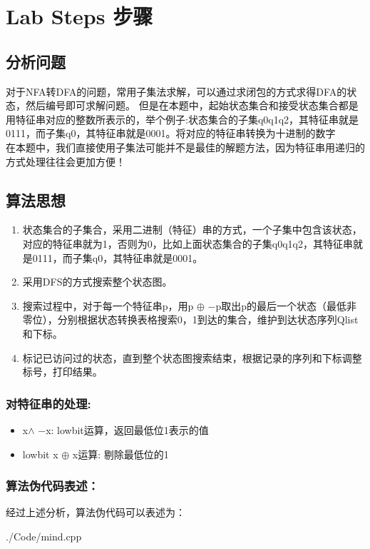 \section{Lab Steps 步骤}
\subsection{分析问题}
对于NFA转DFA的问题，常用子集法求解，可以通过求闭包的方式求得DFA的状态，然后编号即可求解问题。
但是在本题中，起始状态集合和接受状态集合都是用特征串对应的整数所表示的，举个例子:状态集合的子集{q0q1q2}，其特征串就是0111，而子集{q0}，其特征串就是0001。将对应的特征串转换为十进制的数字
\\在本题中，我们直接使用子集法可能并不是最佳的解题方法，因为特征串用递归的方式处理往往会更加方便！

\subsection{算法思想}

\begin{enumerate}
    \item 状态集合的子集合，采用二进制（特征）串的方式，一个子集中包含该状态，对应的特征串就为1，否则为0，比如上面状态集合的子集{q0q1q2}，其特征串就是0111，而子集{q0}，其特征串就是0001。
    \item 采用DFS的方式搜索整个状态图。
    \item 搜索过程中，对于每一个特征串p，用p $\oplus$ $-$p取出p的最后一个状态（最低非零位），分别根据状态转换表格搜索0，1到达的集合，维护到达状态序列Qlist和下标。
    \item 标记已访问过的状态，直到整个状态图搜索结束，根据记录的序列和下标调整标号，打印结果。
\end{enumerate}
\subsubsection{对特征串的处理:}
\begin{itemize}
    \item x$\wedge $ $-$x: lowbit运算，返回最低位1表示的值
    \item lowbit x $\oplus$ x运算: 剔除最低位的1
\end{itemize}

\newpage
\subsubsection{算法伪代码表述：}
经过上述分析，算法伪代码可以表述为：

{./Code/mind.cpp}

